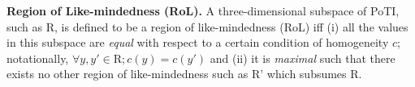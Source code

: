 \documentclass[sigconf]{acmart}
\begin{document}
\begin{definition}
  \textbf{Region of Like-mindedness (RoL).} A three-dimensional subspace of PoTI, such as $\text{R}$, is defined to be a region of like-mindedness (RoL) iff (i) all the values in this subspace are \textit{equal} with respect to a certain condition of homogeneity $c$; notationally, $\forall{y,y'}\in\text{R};c(y)=c(y')$ and (ii) it is \textit{maximal} such that there exists no other region of like-mindedness such as $\text{R'}$ which subsumes $\text{R}$.
\end{definition}


\end{document}
